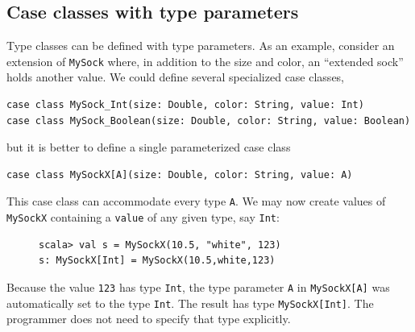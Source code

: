 \subsection{Case classes with type parameters}

Type classes can be defined with type parameters.
As an example, consider an extension of \lstinline!MySock! where,
in addition to the size and color, an \textsf{``}extended sock\textsf{''} holds another
value. We could define several specialized case classes,
\begin{lstlisting}
case class MySock_Int(size: Double, color: String, value: Int)
case class MySock_Boolean(size: Double, color: String, value: Boolean)
\end{lstlisting}
but it is better to define a single parameterized case class
\begin{lstlisting}
case class MySockX[A](size: Double, color: String, value: A)
\end{lstlisting}
This case class can accommodate every type \lstinline!A!. We may
now create values of \lstinline!MySockX! containing a \lstinline!value!
of any given type, say \lstinline!Int!:

\begin{figure}%
\vspace{-0.75\baselineskip}
\begin{lstlisting}
scala> val s = MySockX(10.5, "white", 123)
s: MySockX[Int] = MySockX(10.5,white,123) 
\end{lstlisting}

\vspace{-1\baselineskip}
\end{figure}%

\noindent Because the value \lstinline!123! has type \lstinline!Int!,
the type parameter \lstinline!A! in \lstinline!MySockX[A]! was automatically
set to the type \lstinline!Int!. The result has type \lstinline!MySockX[Int]!.
The programmer does not need to specify that type explicitly.

